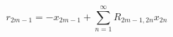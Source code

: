 \begin{equation}\label{eq120:ps}
	r_{2m-1}=-x_{2m-1}+\sum^{\infty}_{n=1}R_{2m-1,2n}x_{2n}
\end{equation}

